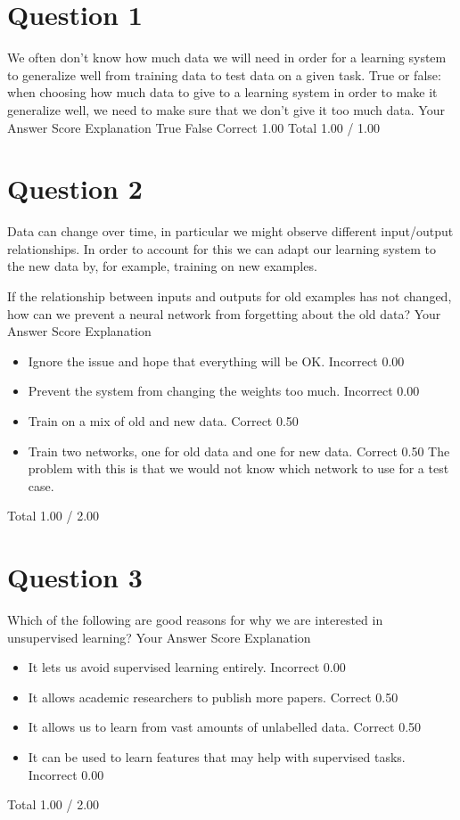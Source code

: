 \newpage
\section*{Question 1}
We often don't know how much data we will need in order for a learning system to generalize well from training data to test data on a given task. 
True or false: when choosing how much data to give to a learning system in order to make it generalize well, we need to make sure that we don't give it too much data.
Your Answer		Score	Explanation
True			
False	Correct	1.00	
Total		1.00 / 1.00	

\newpage
\section*{Question 2}
Data can change over time, in particular we might observe different input/output relationships. In order to account for this we can adapt our learning system to the new data by, for example, training on new examples. 

If the relationship between inputs and outputs for old examples has not changed, how can we prevent a neural network from forgetting about the old data?
Your Answer		Score	Explanation
\begin{itemize}
\item Ignore the issue and hope that everything will be OK.	Incorrect	0.00	
\item Prevent the system from changing the weights too much.	Incorrect	0.00	
\item Train on a mix of old and new data.	Correct	0.50	
\item Train two networks, one for old data and one for new data.	Correct	0.50	The problem with this is that we would not know which network to use for a test case.
\end{itemize}
Total		1.00 / 2.00	

\newpage
\section*{Question 3}
Which of the following are good reasons for why we are interested in unsupervised learning?
Your Answer		Score	Explanation
\begin{itemize}
\item It lets us avoid supervised learning entirely.	Incorrect	0.00	
\item It allows academic researchers to publish more papers.	Correct	0.50	
\item It allows us to learn from vast amounts of unlabelled data.	Correct	0.50	
\item It can be used to learn features that may help with supervised tasks.	Incorrect	0.00	
\end{itemize}
Total		1.00 / 2.00	

